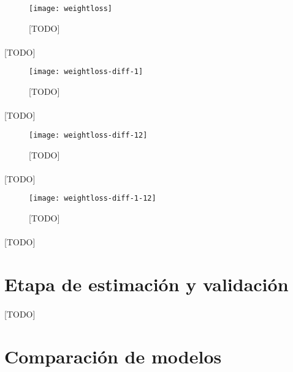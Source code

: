\documentclass[a4paper, spanish]{article}
\begin{document}
    \begin{figure}
      \texttt{[image: weightloss]}
      \caption{[TODO]}
      \label{}
    \end{figure}

    \paragraph{}
    [TODO]

    \begin{figure}
      \texttt{[image: weightloss-diff-1]}
      \caption{[TODO]}
      \label{}
    \end{figure}

    \paragraph{}
    [TODO]

    \begin{figure}
      \texttt{[image: weightloss-diff-12]}
      \caption{[TODO]}
      \label{}
    \end{figure}

    \paragraph{}
    [TODO]

    \begin{figure}
      \texttt{[image: weightloss-diff-1-12]}
      \caption{[TODO]}
      \label{}
    \end{figure}

    \paragraph{}
    [TODO]

  \section{Etapa de estimación y validación}
  \label{sec:2}

    \paragraph{}
    [TODO]

  \section{Comparación de modelos}
  \label{sec:comparison}
\end{document}
